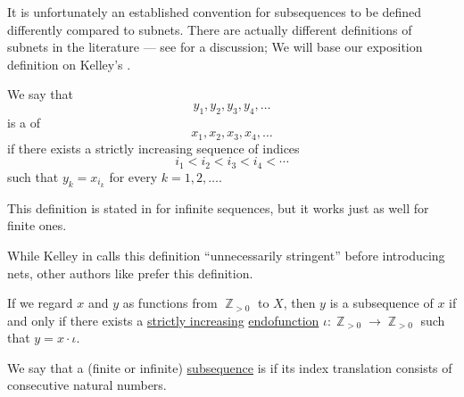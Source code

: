 It is unfortunately an established convention for subsequences to be defined differently compared to subnets. There are actually different definitions of subnets in the literature --- see \cite[\S 7.14]{Schechter1997AnalysisHandbook} for a discussion; We will base our exposition definition on Kelley's \cite[ch. 2]{Kelley1975Topology}.

\begin{definition}\label{def:subsequence}
  We say that
  \begin{equation}\label{eq:def:subsequence/sub}
    y_1, y_2, y_3, y_4, \ldots
  \end{equation}
  is a  of
  \begin{equation}\label{eq:def:subsequence/original}
    x_1, x_2, x_3, x_4, \ldots
  \end{equation}
  if there exists a strictly increasing sequence of indices
  \begin{equation*}
    i_1 < i_2 < i_3 < i_4 < \cdots
  \end{equation*}
  such that \( y_k = x_{i_k} \) for every \( k = 1, 2, \ldots \).
\end{definition}
\begin{comments}
  \item This definition is stated in \cite[63]{Kelley1975Topology} for infinite sequences, but it works just as well for finite ones.

  \item While Kelley in \cite[63]{Kelley1975Topology} calls this definition \enquote{unnecessarily stringent} before introducing nets, other authors like  prefer this definition.

  \item If we regard \( x \) and \( y \) as functions from \( \BbbZ_{>0} \) to \( X \), then \( y \) is a subsequence of \( x \) if and only if there exists a \hyperref[def:order_function/preserving]{strictly increasing} \hyperref[def:function/endofunction]{endofunction} \( \iota: \BbbZ_{>0} \to \BbbZ_{>0} \) such that \( y = x \cdot \iota \).
\end{comments}

\begin{definition}\label{def:contiguous_subsequence}\mimprovised
  We say that a (finite or infinite) \hyperref[def:subsequence]{subsequence} is  if its index translation consists of consecutive natural numbers.
\end{definition}

